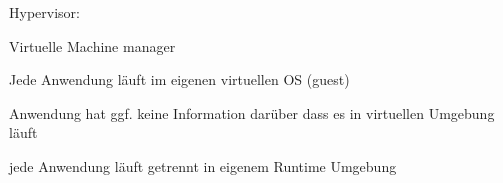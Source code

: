 \begin{notes}
\begin{notes}
\begin{notes}
        \end{notes}
        \item Hypervisor:
        \begin{notes}
            \item Virtuelle Machine manager
            \item Jede Anwendung läuft im eigenen virtuellen OS (guest)
            \item Anwendung hat ggf. keine Information darüber dass es in virtuellen Umgebung läuft
            \item jede Anwendung läuft getrennt in eigenem Runtime Umgebung
            \item 
        \end{notes}
    \end{notes}
\end{notes} 